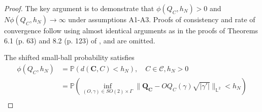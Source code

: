 \documentclass[11pt]{amsart}
\newcommand{\Rtwo}{\mathbb{R}^2}
\newcommand{\ltwo}{\mathbb{L}^2}
\newcommand{\uc}{\mathbb{S}}
\theoremstyle{definition}
\begin{document}
\begin{proof}
The key argument is to demonstrate that $\phi(Q_C,h_N)>0$ and $N\phi(Q_C,h_N)\to \infty$ under assumptions A1-A3. Proofs of consistency and rate of convergence follow using almost identical arguments as in the proofs of Theorems 6.1 (p. 63) and 8.2 (p. 123) of \cite{FV}, and are omitted. 

The shifted small-ball probability satisfies
\begin{align*}
\phi(Q_C,h_N)&=\mathbb{P}(d(\mathbf{C},C) < h_N), \quad C \in \mathcal{C}, h_N>0\\
&=\mathbb{P}\left(\inf_{(O,\gamma) \in SO(2) \times \Gamma}\|\mathbf{Q_C}-OQ_{C}(\gamma)\sqrt{|\gamma'|}\|_{\ltwo}<h_N\right)\\

\end{align*}
\end{proof}
\end{document}
